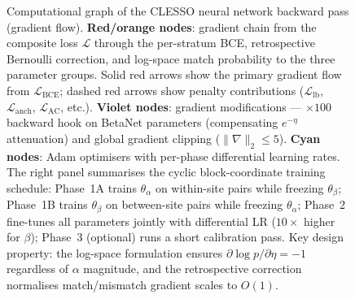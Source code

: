 \documentclass{article}
\begin{document}
\begin{landscape}
\begin{figure}[h]
{\begin{tikzpicture}
\end{tikzpicture}
}%
\caption{%
Computational graph of the CLESSO neural network backward pass (gradient flow).
\textbf{Red/orange nodes}: gradient chain from the composite loss $\mathcal{L}$ through the per-stratum BCE, retrospective Bernoulli correction, and log-space match probability to the three parameter groups.
Solid red arrows show the primary gradient flow from $\mathcal{L}_{\mathrm{BCE}}$; dashed red arrows show penalty contributions ($\mathcal{L}_{\mathrm{lb}}$, $\mathcal{L}_{\mathrm{anch}}$, $\mathcal{L}_{\mathrm{AC}}$, etc.).
\textbf{Violet nodes}: gradient modifications --- $\times 100$ backward hook on BetaNet parameters (compensating $e^{-\eta}$ attenuation) and global gradient clipping ($\lVert\nabla\rVert_2 \leq 5$).
\textbf{Cyan nodes}: Adam optimisers with per-phase differential learning rates.
The right panel summarises the cyclic block-coordinate training schedule: Phase~1A trains $\theta_\alpha$ on within-site pairs while freezing $\theta_\beta$; Phase~1B trains $\theta_\beta$ on between-site pairs while freezing $\theta_\alpha$; Phase~2 fine-tunes all parameters jointly with differential LR ($10\times$ higher for $\beta$); Phase~3 (optional) runs a short calibration pass.
Key design property: the log-space formulation ensures $\partial \log p / \partial\eta = -1$ regardless of $\alpha$ magnitude, and the retrospective correction normalises match/mismatch gradient scales to $O(1)$.%
}
\label{fig:backward-pass}
\end{figure}
\vspace*{-0.5cm}
\end{landscape}
\end{document}
